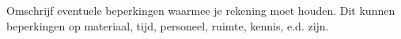 Omschrijf eventuele beperkingen waarmee je rekening moet houden. Dit kunnen beperkingen op materiaal, tijd, personeel, ruimte, kennis, e.d. zijn.